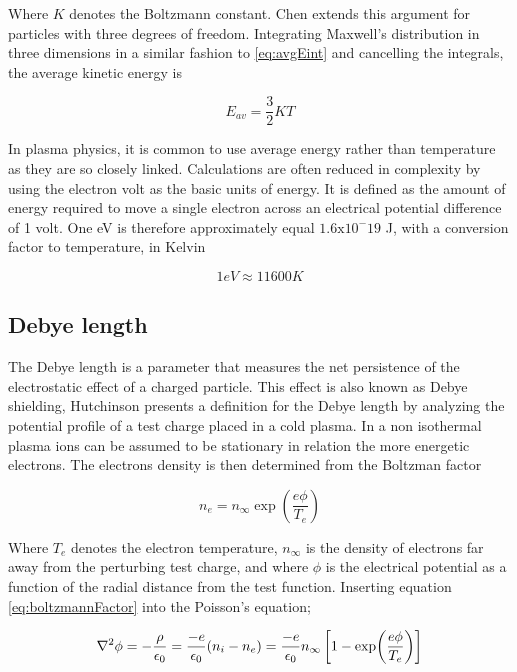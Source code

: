 Where $K$ denotes the Boltzmann constant. Chen extends this argument for particles with three degrees of freedom. Integrating Maxwell's distribution in three dimensions in a similar fashion to \ref{eq:avgEint} and cancelling the integrals, the average kinetic energy is

\begin{equation}\label{eq:avgE3D}
    E_{av} = \frac{3}{2} K T
\end{equation}

In plasma physics, it is common to use average energy rather than temperature as they are so closely linked. Calculations are often reduced in complexity by using the electron volt as the basic units of energy. It is defined as the amount of energy required to move a single electron across an electrical potential difference of 1 volt. One eV is therefore approximately equal $1.6 \text{x} 10^-19$ J, with a conversion factor to temperature, in Kelvin

\begin{equation*}
    1 eV \approx 11600 K
\end{equation*}

\subsection{Debye length}
The Debye length is a parameter that measures the net persistence of the electrostatic effect of a charged particle. This effect is also known as Debye shielding, Hutchinson  presents a definition for the Debye length by analyzing the potential profile of a test charge placed in a cold plasma. In a non isothermal plasma ions can be assumed to be stationary in relation the more energetic electrons. The electrons density is then determined from the Boltzman factor

\begin{equation}\label{eq:boltzmannFactor}
    n_e = n_{\infty} \exp(\frac{e \phi}{T_e})
\end{equation}

Where $T_e$ denotes the electron temperature, $n_{\infty}$ is the density of electrons far away from the perturbing test charge, and where $\phi$ is the electrical potential as a function of the radial distance from the test function. Inserting equation \ref{eq:boltzmannFactor} into the Poisson's equation;

\begin{equation}\label{eq:poissonDebye}
    \laplacian{\phi}  = - \frac{\rho}{\epsilon_0} = \frac{-e}{\epsilon_0} (n_i - n_e) = \frac{-e}{\epsilon_0} n_{\infty} \left[1 - \exp (\frac{e \phi}{T_e}) \right]
\end{equation}

